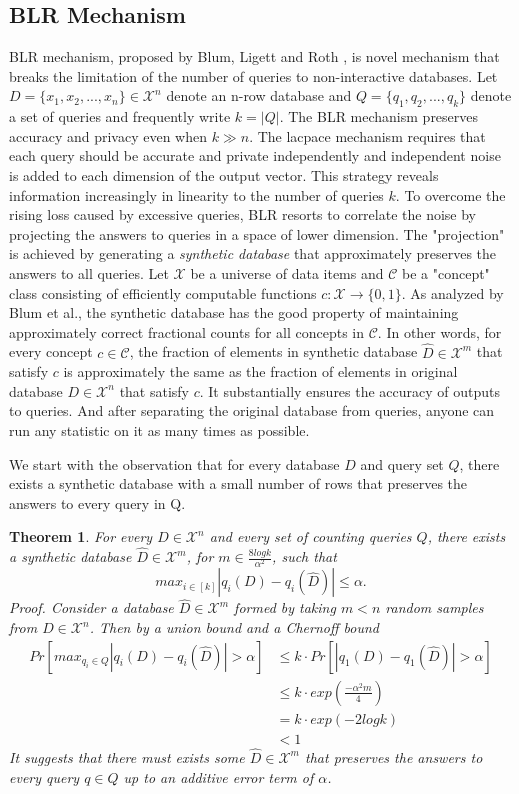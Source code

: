 \documentclass[a4paper, 11pt]{article} %
\makeatletter
\DeclareRobustCommand{\etal}{et al.\@\xspace}
\newtheorem{theorem}{Theorem}
\makeatother
\begin{document}
\subsection{BLR Mechanism}
BLR mechanism, proposed by Blum, Ligett and Roth \cite{blum2013learning}, is novel mechanism that breaks the limitation of the number of queries to non-interactive databases. Let $D = \{x_1, x_2, ..., x_n\} \in \mathcal{X}^n$ denote an n-row database and $Q=\{q_1, q_2, ..., q_k\}$ denote a set of queries and frequently write $k=|Q|$. The BLR mechanism preserves accuracy and privacy even when $k \gg n$. The lacpace mechanism requires that each query should be accurate and private independently and independent noise is added to each dimension of the output vector. This strategy reveals information increasingly in linearity to the number of queries $k$. To overcome the rising loss caused by excessive queries, BLR resorts to correlate the noise by projecting the answers to queries in a space of lower dimension. The "projection" is achieved by generating a \textit{synthetic database} that approximately preserves the answers to all queries. Let $\mathcal{X}$ be a universe of data items and $\mathcal{C}$ be a "concept" class consisting of efficiently computable functions $c: \mathcal{X} \rightarrow \{ 0, 1\}$. As analyzed by Blum \etal \cite{blum2013learning}, the synthetic database has the good property of maintaining approximately correct fractional counts for all concepts in $\mathcal{C}$. In other words, for every concept $c \in \mathcal{C}$, the fraction of elements in synthetic database $\hat{D} \in \mathcal{X}^m$ that satisfy $c$ is approximately the same as the fraction of elements in original database $D \in \mathcal{X}^n$ that satisfy $c$. It substantially ensures the accuracy of outputs to queries. And after separating the original database from queries, anyone can run any statistic on it as many times as possible.

We start with the observation that for every database $D$ and query set $Q$, there exists a synthetic database with a small number of rows that preserves the answers to every query in Q.

\begin{theorem}
\textit{
For every $D \in \mathcal{X}^n$ and every set of counting queries $Q$, there exists a synthetic database $\hat{D} \in \mathcal{X}^m$, for $m \in \frac{8logk}{\alpha^2}$, such that
$$ max_{i \in [k]} | q_i(D) - q_i(\hat{D}) | \leq \alpha. $$
Proof. Consider a database $\hat{D}\in \mathcal{X}^m$ formed by taking $m < n$ random samples from $D \in \mathcal{X}^n$. Then by a union bound and a Chernoff bound 
\begin{align}
Pr\left[ max_{q_i \in Q} | q_i(D) - q_i(\hat{D})   | > \alpha \right]
&\leq  k \cdot Pr \left[ | q_1(D) - q_1(\hat{D})   |  > \alpha  \right] \\
& \leq k \cdot exp\left( \frac{-\alpha^2 m}{4} \right) \\
&= k \cdot exp(-2logk) \\
& < 1
\end{align}
}
It suggests that there must exists some $\hat{D} \in \mathcal{X}^m$ that preserves the answers to every query $q \in Q$ up to an additive error term of $\alpha$.
\end{theorem}
\end{document}
